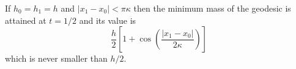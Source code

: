 
\begin{remark}
If $h_0=h_1=h$ and $|x_1-x_0|<\pi \kappa$ then the minimum mass of the geodesic is attained at $t=1/2$ and its value is
\[
\frac h2 \left[ 1+\cos \left( \frac{|x_1-x_0|}{2\kappa} \right) \right]
\] 
which is never smaller than $h/2$.
\end{remark}

